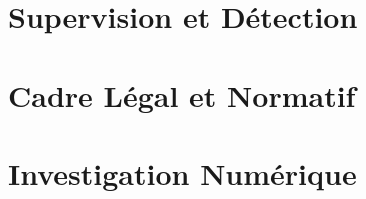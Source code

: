 \documentclass[12pt, a4paper, twoside, openright]{book}
\begin{document}



\part{Supervision et Détection}








\part{Cadre Légal et Normatif}




\part{Investigation Numérique}








\end{document}
